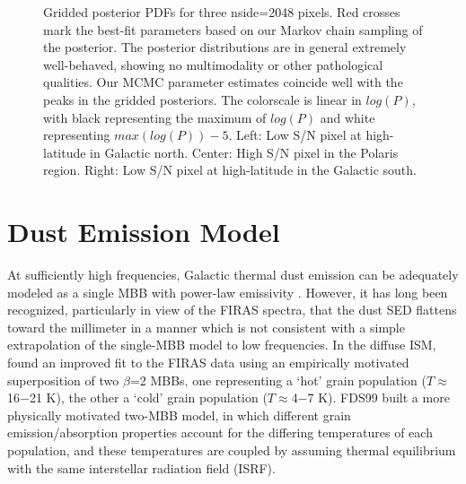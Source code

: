 \documentclass{emulateapj}
\begin{document}
\begin{figure*}
\begin{center}
\caption{Gridded posterior PDFs for three nside=2048 pixels. Red crosses mark 
the best-fit parameters based on our Markov chain sampling of the posterior. 
The posterior distributions are in general extremely well-behaved, showing
no multimodality or other pathological qualities. Our MCMC parameter 
estimates coincide well with the peaks in the gridded posteriors. The 
colorscale is linear in $log(P)$, with black representing the maximum of 
$log(P)$ and white representing $max(log(P))-5$. Left: Low S/N pixel at 
high-latitude in Galactic north. Center: High S/N pixel in the Polaris region. 
Right: Low S/N pixel at high-latitude in the Galactic south.}
\end{center}
\end{figure*}


\section{Dust Emission Model}
\label{sec:modeling}



At sufficiently high frequencies, Galactic thermal dust emission can be 
adequately modeled as a single MBB with power-law emissivity 
\citep[e.g. SFD;][]{planckdust}. However, it has long been recognized, 
particularly in view of the FIRAS spectra, that the dust SED flattens toward 
the millimeter in a manner which is not consistent with a simple extrapolation 
of the single-MBB model to low frequencies. In the diffuse ISM, \cite{reach95} 
found an improved fit to the FIRAS data using an empirically motivated 
superposition of two $\beta$=2 MBBs, one representing a `hot' grain population 
($T$$\approx$16$-$21 K), the other a `cold' grain population 
($T$$\approx$4$-$7 K). FDS99 built a more physically motivated two-MBB model, 
in which different grain emission/absorption properties account for the 
differing temperatures of each population, and these temperatures are coupled 
by assuming thermal equilibrium with the same interstellar radiation field 
(ISRF).
\end{document}
